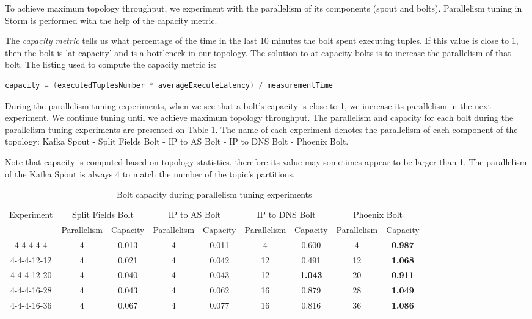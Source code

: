 To achieve maximum topology throughput, we experiment with the parallelism of its components (spout and bolts). Parallelism tuning in Storm is performed with the help of the capacity metric. 

The \emph{capacity metric} tells us what percentage of the time in the last 10 minutes the bolt spent executing tuples. If this value is close to 1, then the bolt is 'at capacity' and is a bottleneck in our topology. The solution to at-capacity bolts is to increase the parallelism of that bolt. The listing used to compute the capacity metric is:

\begin{lstlisting}[language=C]
capacity = (executedTuplesNumber * averageExecuteLatency) / measurementTime
\end{lstlisting}

During the parallelism tuning experiments, when we see that a bolt's capacity is close to 1, we increase its parallelism in the next experiment. We continue tuning until we achieve maximum topology throughput. The parallelism and capacity for each bolt during the parallelism tuning experiments are presented on Table \ref{table:parallelism_tuning}. The name of each experiment denotes the parallelism of each component of the topology: Kafka Spout - Split Fields Bolt - IP to AS Bolt - IP to DNS Bolt - Phoenix Bolt.

Note that capacity is computed based on topology statistics, therefore its value may sometimes appear to be larger than 1. The parallelism of the Kafka Spout is always 4 to match the number of the topic's partitions.

\begin{table}[H]
\centering
\resizebox{1\textwidth}{!} {
\begin{tabular}{ |*{9}{c|} }
\hline
\multirow{2}{*}{Experiment} & \multicolumn{2}{|c|}{Split Fields Bolt} & \multicolumn{2}{|c|}{IP to AS Bolt} & \multicolumn{2}{|c|}{IP to DNS Bolt} & \multicolumn{2}{|c|}{Phoenix Bolt} \\ \cline{2-9}
 & Parallelism & Capacity & Parallelism & Capacity & Parallelism & Capacity & Parallelism & Capacity \\ \hline \hline
4-4-4-4-4 & 4 & 0.013 & 4 & 0.011 & 4 & 0.600 & 4 & \textbf{0.987} \\ \hline
4-4-4-12-12 & 4 & 0.021 & 4 & 0.042 & 12 & 0.491 & 12 & \textbf{1.068} \\ \hline
4-4-4-12-20 & 4 & 0.040 & 4 & 0.043 & 12 & \textbf{1.043} & 20 & \textbf{0.911} \\ \hline
4-4-4-16-28 & 4 & 0.043 & 4 & 0.062 & 16 & 0.879 & 28 & \textbf{1.049} \\ \hline
4-4-4-16-36 & 4 & 0.067 & 4 & 0.077 & 16 & 0.816 & 36 & \textbf{1.086} \\ \hline
\end{tabular}
}
\caption{Bolt capacity during parallelism tuning experiments}
\label{table:parallelism_tuning}
\end{table}


